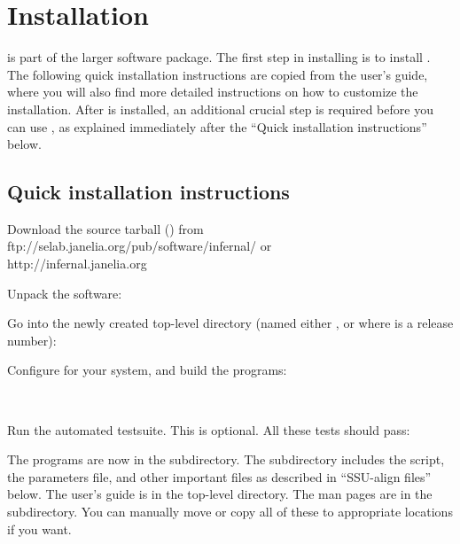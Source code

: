\section{Installation}
\label{sec:install}

 is part of the larger  software
package. The first step in installing  is to install
. The following quick installation instructions are
copied from the  user's guide, where you will also find
more detailed instructions on how to customize the installation. 
After  is installed, an additional crucial step is
required before you can use , as explained immediately
after the ``Quick installation instructions'' below.

\subsection{Quick installation instructions}

Download the source tarball () from 
                  {ftp://selab.janelia.org/pub/software/infernal/}
or \\
                  {http://infernal.janelia.org}

Unpack the software:


Go into the newly created top-level directory (named either
, or  where  is a release
number):


Configure for your system, and build the programs:

\\

Run the automated testsuite. This is optional. All these tests should
pass:


The  programs are now in the 
subdirectory. The  subdirectory includes the
  script, the 
parameters file, and other important files as described in ``SSU-align
files'' below.  The  user's guide is in the top-level
 directory. The man pages are in the
 subdirectory. You can manually move or
copy all of these to appropriate locations if you want.

